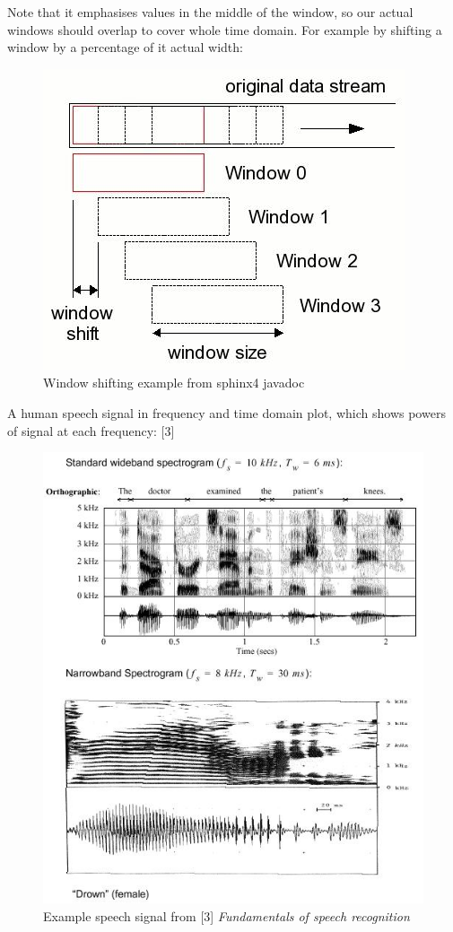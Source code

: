 \documentclass[12pt,a4paper,english]{article}
\begin{document}
\newpage
Note that it emphasises values in the middle of the window, so our actual windows should overlap to cover whole time domain. For example by shifting a window by a percentage of it actual width:
\begin{figure}[hb]
    \centering
    \includegraphics[scale=0.3]{window_shifting.jpg}
    \caption[]{Window shifting example from sphinx4 javadoc}
\end{figure}

A human speech signal in frequency and time domain plot, which shows powers of signal at each frequency: [3]
\begin{figure}[hb]
    \centering
    \includegraphics[scale=0.5]{speech_spectrogram.jpg}
    \caption[]{Example speech signal from [3] \emph{Fundamentals of speech recognition}}
\end{figure}
\end{document}
